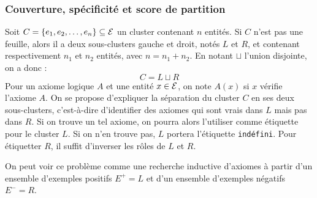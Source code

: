 \subsubsection{Couverture, spécificité et score de partition}
Soit $C = \{e_1, e_2, \ldots, e_n \} \subseteq \mathcal{E}$ un cluster contenant $n$ entités. Si $C$ n'est pas une feuille, alors il a deux sous-clusters gauche et droit, notés $L$ et $R$, et contenant respectivement $n_1$ et $n_2$ entités, avec $n = n_1 + n_2$. En notant $\sqcup$ l'union disjointe, on a donc :
\begin{equation}
C = L \sqcup R
\end{equation}
Pour un axiome logique $A$ et une entité $x \in \mathcal{E}$, on note $A(x)$ si $x$ vérifie l'axiome $A$. On se propose d'expliquer la séparation du cluster $C$ en ses deux sous-clusters, c'est-à-dire d'identifier des axiomes qui sont vrais dans $L$ mais pas dans $R$. Si on trouve un tel axiome, on pourra alors l'utiliser comme étiquette pour le cluster $L$. Si on n'en trouve pas, $L$ portera l'étiquette \texttt{indéfini}. Pour étiquetter $R$, il suffit d'inverser les rôles de $L$ et $R$.

On peut voir ce problème comme une recherche inductive d'axiomes à partir d'un ensemble d'exemples positifs $E^+ = L$ et d'un ensemble d'exemples négatifs $E^- = R$. 


